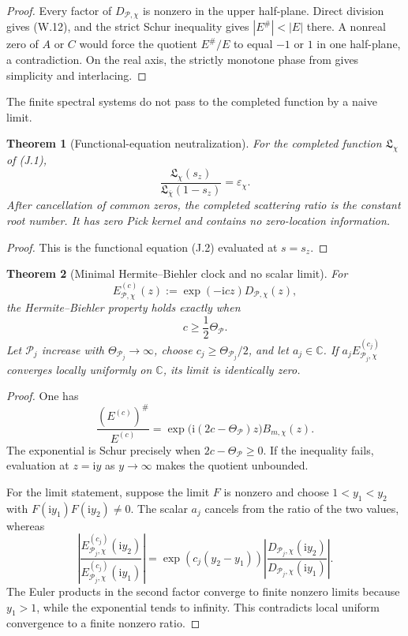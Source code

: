 \documentclass[11pt]{article}
\newtheorem{theorem}{Theorem}[section]
\theoremstyle{definition}
\theoremstyle{remark}
\newcommand{\C}{\mathbb C}
\begin{document}
\begin{proof}
Every factor of $D_{\mathcal P,\chi}$ is nonzero in the upper half-plane.
Direct division gives \textup{(W.12)}, and the strict Schur inequality gives
$|E^\#|<|E|$ there.  A nonreal zero of $A$ or $C$ would force the quotient
$E^\#/E$ to equal $-1$ or $1$ in one half-plane, a contradiction.  On the
real axis, the strictly monotone phase from
 gives simplicity and interlacing.
\end{proof}

The finite spectral systems do not pass to the completed function by a naive
limit.

\begin{theorem}[Functional-equation neutralization]
\label{thm:weil-completed-ratio}
For the completed function $\mathfrak L_\chi$ of \textup{(J.1)},
\[
 \boxed{
 \frac{\mathfrak L_\chi(s_z)}
 {\mathfrak L_{\overline\chi}(1-s_z)}
 =\varepsilon_\chi.}
 \tag{W.13}
\]
After cancellation of common zeros, the completed scattering ratio is the
constant root number.  It has zero Pick kernel and contains no zero-location
information.
\end{theorem}

\begin{proof}
This is the functional equation \textup{(J.2)} evaluated at $s=s_z$.
\end{proof}

\begin{theorem}[Minimal Hermite--Biehler clock and no scalar limit]
\label{thm:weil-no-scalar-limit}
For
\[
 E_{\mathcal P,\chi}^{(c)}(z)
 :=\exp(-\mathrm icz)D_{\mathcal P,\chi}(z),
\]
the Hermite--Biehler property holds exactly when
\[
 \boxed{c\ge\frac12\Theta_{\mathcal P}.}
 \tag{W.14}
\]
Let $\mathcal P_j$ increase with
$\Theta_{\mathcal P_j}\to\infty$, choose
$c_j\ge\Theta_{\mathcal P_j}/2$, and let $a_j\in\C$.  If
$a_jE_{\mathcal P_j,\chi}^{(c_j)}$ converges locally uniformly on $\C$, its
limit is identically zero.
\end{theorem}

\begin{proof}
One has
\[
 \frac{(E^{(c)})^\#}{E^{(c)}}
 =\exp\!\bigl(\mathrm i(2c-\Theta_{\mathcal P})z\bigr)
 B_{m,\chi}(z).
\]
The exponential is Schur precisely when
$2c-\Theta_{\mathcal P}\ge0$.  If the inequality fails, evaluation at
$z=\mathrm iy$ as $y\to\infty$ makes the quotient unbounded.

For the limit statement, suppose the limit $F$ is nonzero and choose
$1<y_1<y_2$ with $F(\mathrm iy_1)F(\mathrm iy_2)\ne0$.  The scalar $a_j$
cancels from the ratio of the two values, whereas
\[
 \left|
 \frac{E_{\mathcal P_j,\chi}^{(c_j)}(\mathrm iy_2)}
      {E_{\mathcal P_j,\chi}^{(c_j)}(\mathrm iy_1)}
 \right|
 =\exp(c_j(y_2-y_1))
  \left|
  \frac{D_{\mathcal P_j,\chi}(\mathrm iy_2)}
       {D_{\mathcal P_j,\chi}(\mathrm iy_1)}
  \right|.
\]
The Euler products in the second factor converge to finite nonzero limits
because $y_1>1$, while the exponential tends to infinity.  This contradicts
local uniform convergence to a finite nonzero ratio.
\end{proof}
\end{document}
